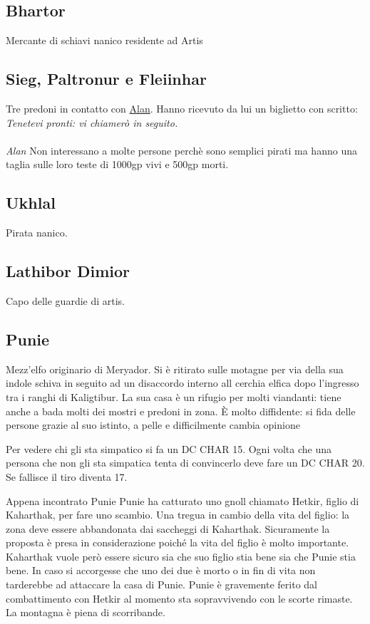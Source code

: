 \subsection{Bhartor}\label{char:bhartor}
Mercante di schiavi nanico residente ad Artis
\subsection{Sieg, Paltronur e Fleiinhar}\label{char:sieg}
Tre predoni in contatto con \hyperref[char:alan]{Alan}. Hanno ricevuto da lui un biglietto con scritto: \\
\textit{
  Tenetevi pronti: vi chiamer\`o in seguito. \\ \\Alan}
Non interessano a molte persone perch\`e sono semplici pirati ma hanno una taglia
sulle loro teste di 1000gp vivi e 500gp morti.
\subsection{Ukhlal}\label{char:ukhlal}
Pirata nanico.
\subsection{Lathibor Dimior}\label{char:lathibor}
Capo delle guardie di artis.
\subsection{Punie}\label{char:punie}
Mezz'elfo originario di Meryador. Si \`e ritirato sulle motagne per via della sua indole
schiva in seguito ad un disaccordo interno all cerchia elfica dopo l'ingresso tra
i ranghi di Kaligtibur.
La sua casa \`e un rifugio per molti viandanti: tiene anche a bada molti dei mostri e
predoni in zona.
\`E molto diffidente: si fida delle persone grazie al suo istinto, a pelle e difficilmente
cambia opinione
\begin{quotebox}
  Per vedere chi gli sta simpatico si fa un DC CHAR 15. Ogni volta che una persona che non gli sta
  simpatica tenta di convincerlo deve fare un DC CHAR 20. Se fallisce il tiro diventa 17.
\end{quotebox}
\begin{commentbox}{Appena incontrato Punie}
  Punie ha catturato uno gnoll chiamato Hetkir, figlio di Kaharthak, per fare uno scambio.
  Una tregua in cambio della vita del figlio: la zona deve essere abbandonata dai saccheggi di
  Kaharthak. Sicuramente la proposta \`e presa in considerazione poich\'e la vita
  del figlio \`e molto importante. Kaharthak vuole per\`o essere sicuro sia che suo figlio stia
  bene sia che Punie stia bene. In caso si accorgesse che uno dei due \`e morto o in fin di vita
  non tarderebbe ad attaccare la casa di Punie. Punie \`e gravemente ferito dal combattimento
  con Hetkir al momento sta sopravvivendo con le scorte rimaste. La montagna \`e piena di scorribande.
\end{commentbox}
